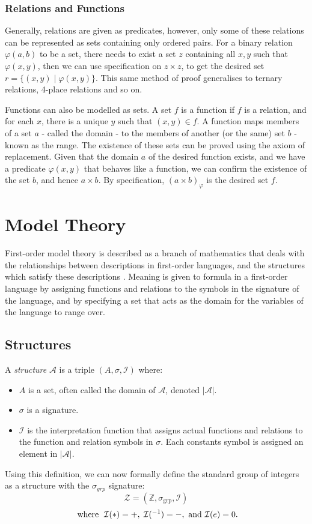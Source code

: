 \documentclass[11pt]{report}
\theoremstyle{definition}
\theoremstyle{theorem}
\theoremstyle{lemma}
\begin{document}
\subsubsection*{Relations and Functions}
Generally, relations are given as predicates, however, only some of these relations can be represented as sets containing only ordered pairs.
For a binary relation $\varphi(a,b)$ to be a set, there needs to exist a set $z$ containing all $x,y$ such that $\varphi(x,y)$, then we can use specification on $z\times z$, to get the desired set $r = \{(x,y) \mid \varphi(x,y)\}$.
This same method of proof generalises to ternary relations, 4-place relations and so on.

Functions can also be modelled as sets.
A set $f$ is a function if $f$ is a relation, and for each $x$, there is a unique $y$ such that $(x,y)\in f$.
A function maps members of a set $a$ - called the domain - to the members of another (or the same) set $b$ - known as the range.
The existence of these sets can be proved using the axiom of replacement.
Given that the domain $a$ of the desired function exists, and we have a predicate $\varphi(x,y)$ that behaves like a function, we can confirm the existence of the set $b$, and hence $a\times b$.
By specification, $(a\times b)_\varphi$ is the desired set $f$.

\section{Model Theory}
First-order model theory is described as a branch of mathematics that deals with the relationships between descriptions in first-order languages, and the structures which satisfy these descriptions \cite{stanmodel}.
Meaning is given to formula in a first-order language by assigning functions and relations to the symbols in the signature of the language, and by specifying a set that acts as the domain for the variables of the language to range over.

\subsection{Structures}
A \emph{structure} \cite[ch.~2.1]{selinger} $\mathcal{A}$ is a triple $(A, \sigma,\mathcal{I})$ where:
\begin{itemize}
  \item $A$ is a set, often called the domain of $\mathcal{A}$, denoted $|\mathcal{A}|$.
  \item $\sigma$ is a signature.
  \item $\mathcal I$ is the interpretation function that assigns actual functions and relations to the function and relation symbols in $\sigma$. Each constants symbol is  assigned an element in $|\mathcal{A}|$.
\end{itemize}
Using this definition, we can now formally define the standard group of integers as a structure with the $\sigma_{\mathit{grp}}$ signature:
$$\mathcal{Z} = (\mathbb{Z}, \sigma_{\text{grp}}, \mathcal{I})$$
$$\text{ where \hspace{1mm}} \mathcal{I}(*) = +,\hspace{1mm} \mathcal{I}(^{-1}) = -, \text{ and } \mathcal{I}(e) = 0.$$
\end{document}
